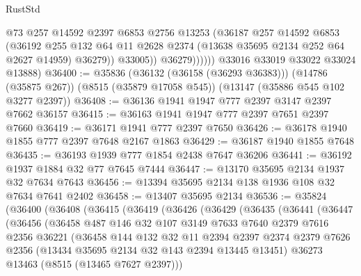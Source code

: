 \begin{lexlean}{RustStd}
\begin{coremodule}
                      @73
                      @257
                      @14592
                      @2397
                      @6853
                      @2756
                      @13253
                      (@36187
                        @257
                        @14592
                        @6853
                        (@36192
                          @255
                          @132
                          @64
                          @11
                          @2628
                          @2374
                          (@13638 @35695 @2134 @252 @64 @2627 @14959)
                          @36279))
                      @33005))
                  @36279))))))
      @33016
      @33019
      @33022
      @33024
      @13888)
@36400 := @35836
    (@36132 (@36158 (@36293 @36383)))
    (@14786 (@35875 @267))
    (@8515 (@35879 @17058 @545))
    (@13147 (@35886 @545 @102 @3277 @2397))
@36408 := @36136 @1941 @1947 @777 @2397 @3147 @2397 @7662 @36157
@36415 := @36163 @1941 @1947 @777 @2397 @7651 @2397 @7660
@36419 := @36171 @1941 @777 @2397 @7650
@36426 := @36178 @1940 @1855 @777 @2397 @7648 @2167 @1863
@36429 := @36187 @1940 @1855 @7648
@36435 := @36193 @1939 @777 @1854 @2438 @7647 @36206
@36441 := @36192 @1937 @1884 @32 @77 @7645 @7444
@36447 := @13170 @35695 @2134 @1937 @32 @7634 @7643
@36456 := @13394 @35695 @2134 @138 @1936 @108 @32 @7634 @7641 @2402
@36458 := @13407 @35695 @2134
@36536 := @35824
    (@36400
      (@36408
        (@36415
          (@36419
            (@36426
              (@36429
                (@36435
                  (@36441
                    (@36447
                      (@36456
                        (@36458
                          @487
                          @146
                          @32
                          @107
                          @3149
                          @7633
                          @7640
                          @2379
                          @7616
                          @2356
                          @36221
                          (@36458
                            @144
                            @132
                            @32
                            @11
                            @2394
                            @2397
                            @2374
                            @2379
                            @7626
                            @2356
                            (@13434 @35695 @2134 @32 @143 @2394 @13445 @13451)
                            @36273
                            @13463
                            (@8515 (@13465 @7627 @2397)))

\end{coremodule}
\end{lexlean}
